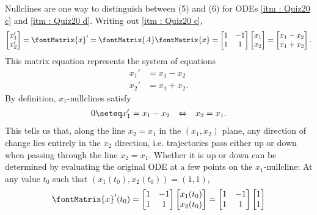 {Nullclines are one way to distinguish between (5) and (6) for ODEs \ref{itm : Quiz20 c} and \ref{itm : Quiz20 d}. Writing out \ref{itm : Quiz20 c},
\begin{align*}
\begin{bmatrix}
x_{1}'	\\
x_{2}'
\end{bmatrix}%
=
\fontMatrix{x}'
=
\fontMatrix{A} \fontMatrix{x}
=
\begin{bmatrix}
1	&	-1	\\
1	&	1
\end{bmatrix}%
\begin{bmatrix}
x_{1}	\\
x_{2}
\end{bmatrix}%
=
\begin{bmatrix}
x_{1} - x_{2}	\\
x_{1} + x_{2}
\end{bmatrix}%
.
\end{align*}
This matrix equation represents the system of equations
\begin{align*}
x_{1}'
&=
x_{1} - x_{2}
\\
x_{2}'
&=
x_{1} + x_{2}.
\end{align*}
By definition, $x_{1}$-nullclines satisfy
\begin{align*}
0
\seteq
x_{1}'
=
x_{1} - x_{2}
&&
\Leftrightarrow
&&
x_{2}
=
x_{1}.
\end{align*}
This tells us that, along the line $x_{2} = x_{1}$ in the $(x_{1},x_{2})$ plane, any direction of change lies entirely in the $x_{2}$ direction, i.e. trajectories pass either up or down when passing through the line $x_{2} = x_{1}$. Whether it is up or down can be determined by evaluating the original ODE at a few points on the $x_{1}$-nullcline: At any value $t_{0}$ such that $(x_{1}(t_{0}),x_{2}(t_{0})) = (1,1)$,
\begin{align*}
\fontMatrix{x}'(t_{0})
=
\begin{bmatrix}
1	&	-1	\\
1	&	1
\end{bmatrix}
\begin{bmatrix}
x_{1}(t_{0})	\\
x_{2}(t_{0})
\end{bmatrix}
=
\begin{bmatrix}
1	&	-1	\\
1	&	1
\end{bmatrix}
\begin{bmatrix}
1	\\
1
\end{bmatrix}

\end{align*}}
